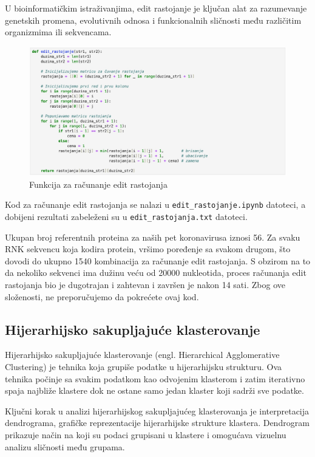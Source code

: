 \documentclass[a4paper,12pt]{article}
\begin{document}
\medskip
U bioinformatičkim istraživanjima, edit rastojanje je ključan alat za razumevanje genetskih promena, evolutivnih odnosa i funkcionalnih sličnosti među različitim organizmima ili sekvencama.


\bigskip
\begin{figure}[h!]
  \centering
  \includegraphics[width=1\textwidth]{slika19.jpeg}
  \caption{Funkcija za računanje edit rastojanja}
  \label{fig:my_label}
\end{figure}

\bigskip
Kod za računanje edit rastojanja se nalazi u \texttt{edit\_rastojanje.ipynb} datoteci, a dobijeni rezultati zabeleženi su u \texttt{edit\_rastojanja.txt} datoteci.

\medskip
Ukupan broj referentnih proteina za naših pet koronavirusa iznosi 56. Za svaku RNK sekvencu koja kodira protein, vršimo poređenje sa svakom drugom, što dovodi do ukupno 1540 kombinacija za računanje edit rastojanja. S obzirom na to da nekoliko sekvenci ima dužinu veću od 20000 nukleotida, proces računanja edit rastojanja bio je dugotrajan i zahtevan i završen je nakon 14 sati. Zbog ove složenosti, ne preporučujemo da pokrećete ovaj kod.


\subsection{Hijerarhijsko sakupljajuće klasterovanje}
Hijerarhijsko sakupljajuće klasterovanje (engl. Hierarchical Agglomerative Clustering) je tehnika koja grupiše podatke u hijerarhijsku strukturu. Ova tehnika počinje sa svakim podatkom kao odvojenim klasterom i zatim iterativno spaja najbliže klastere dok ne ostane samo jedan klaster koji sadrži sve podatke.

\medskip
Ključni korak u analizi hijerarhijskog sakupljajućeg klasterovanja je interpretacija dendrograma, grafičke reprezentacije hijerarhijske strukture klastera. Dendrogram prikazuje način na koji su podaci grupisani u klastere i omogućava vizuelnu analizu sličnosti među grupama.
\end{document}
